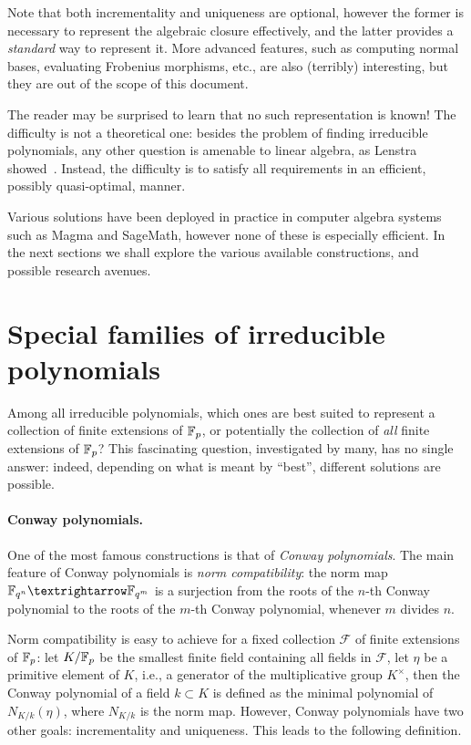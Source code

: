 \documentclass[b5layout]{hdr}
\begin{document}
Note that both incrementality and uniqueness are optional, however the
former is necessary to represent the algebraic closure effectively,
and the latter provides a \emph{standard} way to represent it. %
More advanced features, such as computing normal bases, evaluating
Frobenius morphisms, etc., are also (terribly) interesting, but they
are out of the scope of this document. %

The reader may be surprised to learn that no such representation is
known! %
The difficulty is not a theoretical one: besides the problem of
finding irreducible polynomials, any other question is amenable to
linear algebra, as Lenstra showed~\cite{LenstraJr91}. %
Instead, the difficulty is to satisfy all requirements in an
efficient, possibly quasi-optimal, manner. %

Various solutions have been deployed in practice in computer algebra
systems such as Magma and SageMath, however none of these is
especially efficient. %
In the next sections we shall explore the various available
constructions, and possible research avenues. %


\section{Special families of irreducible polynomials}
\label{sec:spec-famil-irred}

Among all irreducible polynomials, which ones are best suited to
represent a collection of finite extensions of $\mathbb{F}_p$, or potentially
the collection of \emph{all} finite extensions of $\mathbb{F}_p$? %
This fascinating question, investigated by many, has no single answer:
indeed, depending on what is meant by ``best'', different solutions
are possible. %

\paragraph{Conway polynomials.}
One of the most famous constructions is that of \emph{Conway
  polynomials}. %
The main feature of Conway polynomials is \emph{norm compatibility}:
the norm map $\F_{q^n}→\F_{q^m}$ is a surjection from the roots of the
$n$-th Conway polynomial to the roots of the $m$-th Conway polynomial,
whenever $m$ divides $n$. %

Norm compatibility is easy to achieve for a fixed collection
$\mathcal{F}$ of finite extensions of $\mathbb{F}_p$: let $K/\mathbb{F}_p$ be the
smallest finite field containing all fields in $\mathcal{F}$, let $η$
be a primitive element of $K$, i.e., a generator of the multiplicative
group $K^×$, then the Conway polynomial of a field $k⊂K$ is defined as
the minimal polynomial of $N_{K/k}(η)$, where $N_{K/k}$ is the norm
map. %
However, Conway polynomials have two other goals: incrementality and
uniqueness. %
This leads to the following definition.
\end{document}
